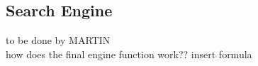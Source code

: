 \subsection{Search Engine}
to be done by MARTIN \\
how does the final engine function work?? insert formula
